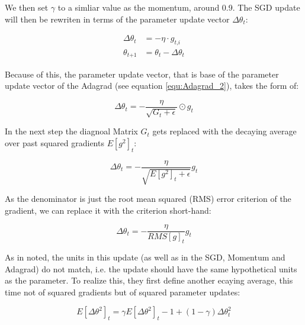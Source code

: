 \documentclass[12pt,oneside,a4paper,parskip]{scrbook}
\begin{document}
We then set $\gamma$ to a simliar value as the momentum, around 0.9. The SGD update will then be rewriten in terms of the 
parameter update vector $\Delta\theta_\textit{t}$:

\begin{equation}
  \begin{split}
    \Delta\theta_\textit{t} &= -\eta \cdot \textit{g}_\textit{t,i} \\
    \theta_\textit{t+1} &= \theta_\textit{t} - \Delta\theta_\textit{t}
  \end{split}
\end{equation}

Because of this, the parameter update vector, that is base of the parameter update vector of the Adagrad (see equation \ref{equ:Adagrad_2}), 
takes the form of:

\begin{equation}
  \Delta\theta_\textit{t} = -\frac{\eta}{\sqrt{\textit{G}_\textit{t} + \epsilon}} \odot \textit{g}_\textit{t}
\end{equation}

In the next step the diagnoal Matrix $\textit{G}_t$ gets replaced with the decaying average over past squared gradients 
$\textit{E}[\textit{g}^2]_\textit{t}$:

\begin{equation}
  \Delta\theta_\textit{t} = -\frac{\eta}{\sqrt{\textit{E}[\textit{g}^2]_\textit{t} + \epsilon}} \textit{g}_\textit{t}
\end{equation}

As the denominator is just the root mean squared (RMS) error criterion of the gradient, we can replace
it with the criterion short-hand: 

\begin{equation}
  \Delta\theta_\textit{t} = -\frac{\eta}{RMS[\textit{g}]_t} \textit{g}_\textit{t}
\end{equation}

As in \cite{AdadeltaAddition} noted, the units in this update (as well as in the SGD, Momentum and Adagrad) do not match,
i.e. the update should have the same hypothetical units as the parameter. To realize this, they first define another 
ecaying average, this time not of squared gradients but of squared parameter updates:

\begin{equation}
  \textit{E}[\Delta\theta^2]_t = \gamma\textit{E}[\Delta\theta^2]_t-1 + (1-\gamma)\Delta\theta^2_t
  \label{equ:adadelta_4}
\end{equation}
\end{document}
